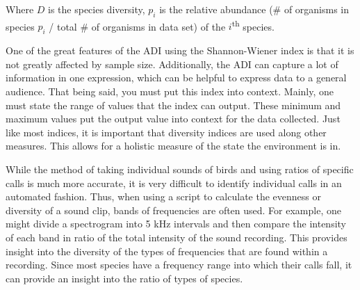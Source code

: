 Where $D$ is the species diversity, $p_i$ is the relative abundance (\# of organisms in species $p_i$ / total \# of organisms in data set) of the $i$\textsuperscript{th} species.\par
One of the great features of the ADI using the Shannon-Wiener index is that it is not greatly affected by sample size. Additionally, the ADI can capture a lot of information in one expression, which can be helpful to express data to a general audience. That being said, you must put this index into context. Mainly, one must state the range of values that the index can output. These minimum and maximum values put the output value into context for the data collected. Just like most indices, it is important that diversity indices are used along other measures. This allows for a holistic measure of the state the environment is in.\cite{shannonWiener}\par
While the method of taking individual sounds of birds and using ratios of specific calls is much more accurate, it is very difficult to identify individual calls in an automated fashion. Thus, when using a script to calculate the evenness or diversity of a sound clip, bands of frequencies are often used. For example, one might divide a spectrogram into 5 kHz intervals and then compare the intensity of each band in ratio of the total intensity of the sound recording. This provides insight into the diversity of the types of frequencies that are found within a recording. Since most species have a frequency range into which their calls fall, it can provide an insight into the ratio of types of species.
